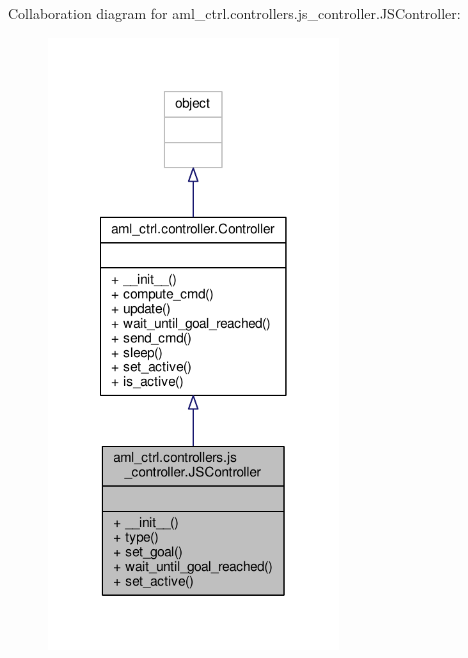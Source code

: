 Collaboration diagram for aml\-\_\-ctrl.\-controllers.\-js\-\_\-controller.\-J\-S\-Controller\-:
\nopagebreak
\begin{figure}[H]
\begin{center}
\leavevmode
\includegraphics[width=218pt]{classaml__ctrl_1_1controllers_1_1js__controller_1_1_j_s_controller__coll__graph}
\end{center}
\end{figure}
